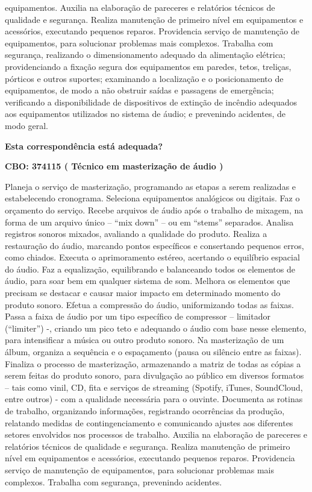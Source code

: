 \documentclass[
]{article}
\begin{document}
equipamentos. Auxilia na elaboração de pareceres e relatórios técnicos
de qualidade e segurança. Realiza manutenção de primeiro nível em
equipamentos e acessórios, executando pequenos reparos. Providencia
serviço de manutenção de equipamentos, para solucionar problemas mais
complexos. Trabalha com segurança, realizando o dimensionamento adequado
da alimentação elétrica; providenciando a fixação segura dos
equipamentos em paredes, tetos, treliças, pórticos e outros suportes;
examinando a localização e o posicionamento de equipamentos, de modo a
não obstruir saídas e passagens de emergência; verificando a
disponibilidade de dispositivos de extinção de incêndio adequados aos
equipamentos utilizados no sistema de áudio; e prevenindo acidentes, de
modo geral.

\begin{Form}
\textbf{Esta correspondência está adequada?} \\ 
\end{Form}

\textbf{CBO: 374115  ( Técnico em masterização de áudio )}

Planeja o serviço de masterização, programando as etapas a serem
realizadas e estabelecendo cronograma. Seleciona equipamentos analógicos
ou digitais. Faz o orçamento do serviço. Recebe arquivos de áudio após o
trabalho de mixagem, na forma de um arquivo único -- ``mix down'' -- ou
em ``stems'' separados. Analisa registros sonoros mixados, avaliando a
qualidade do produto. Realiza a restauração do áudio, marcando pontos
específicos e consertando pequenos erros, como chiados. Executa o
aprimoramento estéreo, acertando o equilíbrio espacial do áudio. Faz a
equalização, equilibrando e balanceando todos os elementos de áudio,
para soar bem em qualquer sistema de som. Melhora os elementos que
precisam se destacar e causar maior impacto em determinado momento do
produto sonoro. Efetua a compressão do áudio, uniformizando todas as
faixas. Passa a faixa de áudio por um tipo específico de compressor --
limitador (``limiter'') -, criando um pico teto e adequando o áudio com
base nesse elemento, para intensificar a música ou outro produto sonoro.
Na masterização de um álbum, organiza a sequência e o espaçamento (pausa
ou silêncio entre as faixas). Finaliza o processo de masterização,
armazenando a matriz de todas as cópias a serem feitas do produto
sonoro, para divulgação ao público em diversos formatos -- tais como
vinil, CD, fita e serviços de streaming (Spotify, iTunes, SoundCloud,
entre outros) - com a qualidade necessária para o ouvinte. Documenta as
rotinas de trabalho, organizando informações, registrando ocorrências da
produção, relatando medidas de contingenciamento e comunicando ajustes
aos diferentes setores envolvidos nos processos de trabalho. Auxilia na
elaboração de pareceres e relatórios técnicos de qualidade e segurança.
Realiza manutenção de primeiro nível em equipamentos e acessórios,
executando pequenos reparos. Providencia serviço de manutenção de
equipamentos, para solucionar problemas mais complexos. Trabalha com
segurança, prevenindo acidentes.
\end{document}

